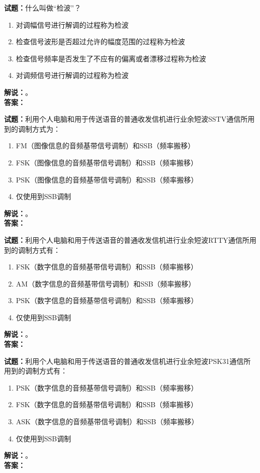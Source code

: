 \documentclass{ctexbook}
\begin{document}
\bigskip




\noindent\textbf{试题：}什么叫做“检波”？
\begin{enumerate}[leftmargin=3em]
\item 对调幅信号进行解调的过程称为检波
\item 检查信号波形是否超过允许的幅度范围的过程称为检波
\item 检查信号频率是否发生了不应有的偏离或者漂移过程称为检波
\item 对调频信号进行解调的过程称为检波
\end{enumerate}
\noindent\textbf{解说：}\textbf{}。\\\noindent\textbf{答案：}

\bigskip




\noindent\textbf{试题：}利用个人电脑和用于传送语音的普通收发信机进行业余短波SSTV通信所用到的调制方式为：
\begin{enumerate}[leftmargin=3em]
\item FM（图像信息的音频基带信号调制）和SSB（频率搬移）
\item FSK（图像信息的音频基带信号调制）和SSB（频率搬移）
\item PSK（图像信息的音频基带信号调制）和SSB（频率搬移）
\item 仅使用到SSB调制
\end{enumerate}
\noindent\textbf{解说：}\textbf{}。\\\noindent\textbf{答案：}

\bigskip




\noindent\textbf{试题：}利用个人电脑和用于传送语音的普通收发信机进行业余短波RTTY通信所用到的调制方式有：
\begin{enumerate}[leftmargin=3em]
\item FSK（数字信息的音频基带信号调制）和SSB（频率搬移）
\item AM（数字信息的音频基带信号调制）和SSB（频率搬移）
\item PSK（数字信息的音频基带信号调制）和SSB（频率搬移）
\item 仅使用到SSB调制
\end{enumerate}
\noindent\textbf{解说：}\textbf{}。\\\noindent\textbf{答案：}

\bigskip




\noindent\textbf{试题：}利用个人电脑和用于传送语音的普通收发信机进行业余短波PSK31通信所用到的调制方式有：
\begin{enumerate}[leftmargin=3em]
\item PSK（数字信息的音频基带信号调制）和SSB（频率搬移）
\item FSK（数字信息的音频基带信号调制）和SSB（频率搬移）
\item ASK（数字信息的音频基带信号调制）和SSB（频率搬移）
\item 仅使用到SSB调制
\end{enumerate}
\noindent\textbf{解说：}\textbf{}。\\\noindent\textbf{答案：}
\end{document}
